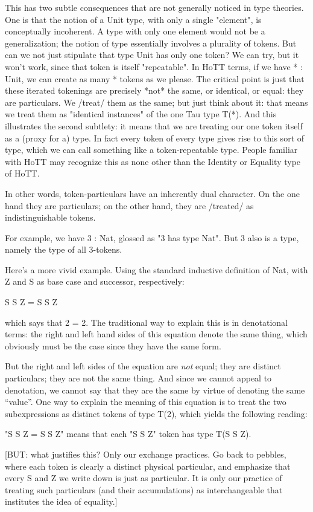 \documentclass{article}
\begin{document}
This has two subtle consequences that are not generally noticed in
type theories.  One is that the notion of a Unit type, with only a
single "element", is conceptually incoherent.  A type with only one
element would not be a generalization; the notion of type essentially
involves a plurality of tokens.  But can we not just stipulate that
type Unit has only one token?  We can try, but it won't work, since
that token is itself "repeatable".  In HoTT terms, if we have * :
Unit, we can create as many * tokens as we please.  The critical point
is just that these iterated tokenings are precisely *not* the same, or
identical, or equal: they are particulars.  We /treat/ them as the
same; but just think about it: that means we treat them as "identical
instances" of the one Tau type T(*).  And this illustrates the second
subtlety: it means that we are treating our one token itself as a
(proxy for a) type.  In fact every token of every type gives rise to
this sort of type, which we can call something like a token-repeatable
type.  People familiar with HoTT may recognize this as none other than
the Identity or Equality type of HoTT.

In other words, token-particulars have an inherently dual character.
On the one hand they are particulars; on the other hand, they are
/treated/ as indistinguishable tokens.

For example, we have 3 : Nat, glossed as "3 has type Nat".  But 3 also
is a type, namely the type of all 3-tokens.

Here's a more vivid example.  Using the standard inductive definition
of Nat, with Z and S as base case and successor, respectively:

    S S Z = S S Z

which says that 2 = 2.  The traditional way to explain this is in
denotational terms: the right and left hand sides of this equation
denote the same thing, which obviously must be the case since they
have the same form.

But the right and left sides of the equation are \emph{not} equal;
they are distinct particulars; they are not the same thing.  And since
we cannot appeal to denotation, we cannot say that they are the same
by virtue of denoting the same ``value''.  One way to explain the
meaning of this equation is to treat the two subexpressions as
distinct tokens of type T(2), which yields the following reading:

  "S S Z = S S Z" means that each "S S Z" token has type T(S S Z).

[BUT: what justifies this?  Only our exchange practices.  Go back to
pebbles, where each token is clearly a distinct physical particular,
and emphasize that every S and Z we write down is just as particular.
It is only our practice of treating such particulars (and their
accumulations) as interchangeable that institutes the idea of
equality.]
\end{document}
